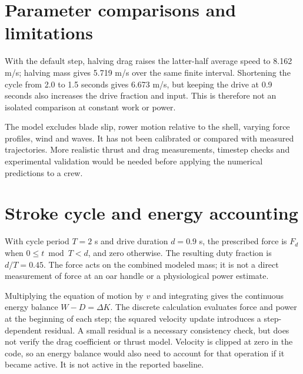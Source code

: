 \documentclass[11pt]{article}
\begin{document}
\section{Parameter comparisons and limitations}
With the default step, halving drag raises the latter-half average speed to 8.162 m/s; halving mass gives 5.719 m/s over the same finite interval. Shortening the cycle from 2.0 to 1.5 seconds gives 6.673 m/s, but keeping the drive at 0.9 seconds also increases the drive fraction and input. This is therefore not an isolated comparison at constant work or power.

The model excludes blade slip, rower motion relative to the shell, varying force profiles, wind and waves. It has not been calibrated or compared with measured trajectories. More realistic thrust and drag measurements, timestep checks and experimental validation would be needed before applying the numerical predictions to a crew.

\section{Stroke cycle and energy accounting}
With cycle period $T=2$ s and drive duration $d=0.9$ s, the prescribed force is $F_d$ when $0\leq t\bmod T<d$, and zero otherwise. The resulting duty fraction is $d/T=0.45$. The force acts on the combined modeled mass; it is not a direct measurement of force at an oar handle or a physiological power estimate.

Multiplying the equation of motion by $v$ and integrating gives the continuous energy balance $W-D=\Delta K$. The discrete calculation evaluates force and power at the beginning of each step; the squared velocity update introduces a step-dependent residual. A small residual is a necessary consistency check, but does not verify the drag coefficient or thrust model. Velocity is clipped at zero in the code, so an energy balance would also need to account for that operation if it became active. It is not active in the reported baseline.
\end{document}
